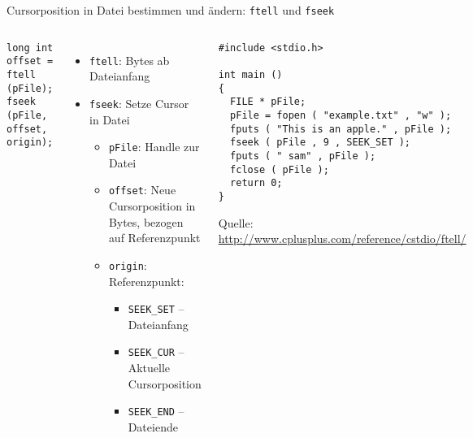 \begin{frame}[fragile]{Cursorposition in Datei bestimmen und ändern: \texttt{ftell} und \texttt{fseek}}
%
\begin{columns}[T]
\begin{codebox}[Syntax]
\begin{verbatim}
long int offset = ftell (pFile);
fseek (pFile, offset, origin);
\end{verbatim}
\end{codebox}
%
\begin{itemize}
\item \texttt{ftell}: Bytes ab Dateianfang
\item \texttt{fseek}: Setze Cursor in Datei
	\begin{itemize}
	\item \texttt{pFile}: Handle zur Datei
	\item \texttt{offset}: Neue Cursorposition in Bytes, bezogen auf Referenzpunkt
	\item \texttt{origin}: Referenzpunkt:
		\begin{itemize}
		\item \texttt{SEEK\_SET} -- Dateianfang
		\item \texttt{SEEK\_CUR} -- Aktuelle Cursorposition
		\item \texttt{SEEK\_END} -- Dateiende
		\end{itemize}
	\end{itemize}
\end{itemize}
%
\begin{codebox}
\begin{verbatim}
#include <stdio.h>

int main ()
{
  FILE * pFile;
  pFile = fopen ( "example.txt" , "w" );
  fputs ( "This is an apple." , pFile );
  fseek ( pFile , 9 , SEEK_SET );
  fputs ( " sam" , pFile );
  fclose ( pFile );
  return 0;
}
\end{verbatim}
\tiny Quelle:\newline
	\url{http://www.cplusplus.com/reference/cstdio/ftell/}
\end{codebox}
\end{columns}
%
\end{frame}


